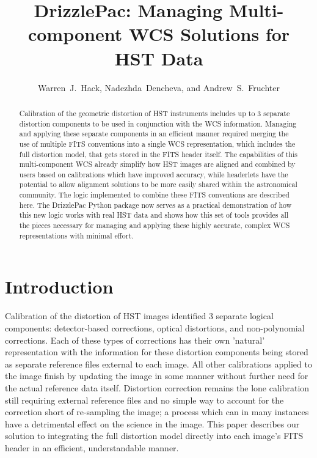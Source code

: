 
\resetcounters




\title{DrizzlePac: Managing Multi-component WCS Solutions for HST Data}
\author{Warren~J.~Hack, Nadezhda~Dencheva, and Andrew~S.~Fruchter
}


\begin{abstract}
Calibration of the geometric distortion of HST instruments includes up to 3 separate distortion components to be used in conjunction with the WCS information. Managing and applying these separate components in an efficient manner required merging the use of multiple FITS conventions into a single WCS representation, which includes the full distortion model, that gets stored in the FITS header itself. The capabilities of this multi-component WCS already simplify how HST images are aligned and combined by users based on calibrations which have improved accuracy, while headerlets have the potential to allow alignment solutions to be more easily shared within the astronomical community. The logic implemented to combine these FITS conventions are described here. The DrizzlePac Python package now serves as a practical demonstration of how this new logic works with real HST data and shows how this set of tools provides all the pieces necessary for managing and applying these highly accurate, complex WCS representations with minimal effort. 
\end{abstract}

\section{Introduction}
Calibration of the distortion of HST images identified 3 separate logical components: detector-based corrections, optical distortions, and non-polynomial corrections. Each of these types of corrections has their own 'natural' representation with the information for these distortion components being stored as separate reference files external to each image. All other calibrations applied to the image finish by updating the image in some manner without further need for the actual reference data itself. Distortion correction remains the lone calibration still requiring external reference files and no simple way to account for the correction short of re-sampling the image; a process which can in many instances have a detrimental effect on the science in the image. This paper describes our solution to integrating the full distortion model directly into each image's FITS header in an efficient, understandable manner.

